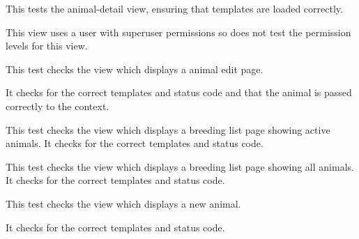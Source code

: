 \documentclass[letterpaper,10pt,english]{sphinxmanual}
\begin{document}
\begin{fulllineitems}
\begin{fulllineitems}
\label{api:mousedb.animal.tests.AnimalViewTests.test_animal_detail}
This tests the animal-detail view, ensuring that templates are loaded correctly.

This view uses a user with superuser permissions so does not test the permission levels for this view.

\end{fulllineitems}


\begin{fulllineitems}
\label{api:mousedb.animal.tests.AnimalViewTests.test_animal_edit}
This test checks the view which displays a animal edit page.

It checks for the correct templates and status code and that the animal is passed correctly to the context.

\end{fulllineitems}


\begin{fulllineitems}
\label{api:mousedb.animal.tests.AnimalViewTests.test_animal_list}
This test checks the view which displays a breeding list page showing active animals.  It checks for the correct templates and status code.

\end{fulllineitems}


\begin{fulllineitems}
\label{api:mousedb.animal.tests.AnimalViewTests.test_animal_list_all}
This test checks the view which displays a breeding list page showing all animals.  It checks for the correct templates and status code.

\end{fulllineitems}


\begin{fulllineitems}
\label{api:mousedb.animal.tests.AnimalViewTests.test_animal_new}
This test checks the view which displays a new animal.

It checks for the correct templates and status code.

\end{fulllineitems}


\end{fulllineitems}
\end{document}
